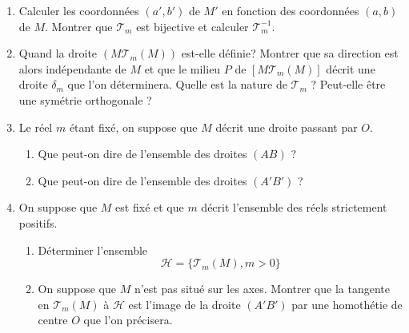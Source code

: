 \begin{enumerate}
  \item Calculer les coordonn{\'e}es $(a',b')$ de $M'$ en fonction des coordonn{\'e}es $(a,b)$ de $M$. Montrer que $\mathcal{T}_m$ est bijective et calculer $\mathcal{T}_m ^{-1}$.

  \item Quand la droite $(M\mathcal{T}_m(M))$ est-elle d{\'e}finie? Montrer que sa direction est alors ind{\'e}pendante de $M$ et que le milieu $P$ de $[M\mathcal{T}_m(M)]$ d{\'e}crit une droite $\delta_m$ que l'on d{\'e}terminera.\newline
  Quelle est la nature de $\mathcal{T}_m$ ? Peut-elle {\^e}tre une sym{\'e}trie orthogonale ?

  \item Le r{\'e}el $m$ {\'e}tant fix{\'e}, on suppose que $M$ d{\'e}crit une droite passant par $O$.
    \begin{enumerate}
      \item Que peut-on dire de l'ensemble des droites $(AB)$ ?
      \item Que peut-on dire de l'ensemble des droites $(A'B')$ ?
    \end{enumerate}

  \item On suppose que $M$ est fix{\'e} et que $m$ d{\'e}crit l'ensemble des r{\'e}els strictement positifs.
    \begin{enumerate}
      \item D{\'e}terminer l'ensemble
      \[\mathcal{H}=\{\mathcal{T}_m(M), m>0\}\]
      \item On suppose que $M$ n'est pas situ{\'e} sur les axes. Montrer que la tangente en $\mathcal{T}_m(M)$ {\`a} $\mathcal{H}$ est l'image de la droite $(A'B')$ par une homoth{\'e}tie de centre $O$ que l'on pr{\'e}cisera.
    \end{enumerate}

 \end{enumerate}

